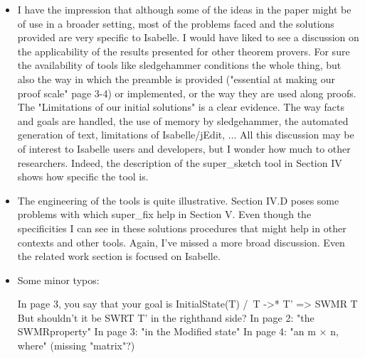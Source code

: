 \documentclass[10pt,conference]{IEEEtran}
\begin{document}
\begin{itemize}
    \item I have the impression that although some of the ideas in the paper might be of use in a broader setting, most of the problems faced and the solutions provided are very specific to Isabelle. I would have liked to see a discussion on the applicability of the results presented for other theorem provers. For sure the availability of tools like sledgehammer conditions the whole thing, but also the way in which the preamble is provided ("essential at making our proof scale" page 3-4) or implemented, or the way they are used along proofs. The "Limitations of our initial solutions" is a clear evidence. The way facts and goals are handled, the use of memory by sledgehammer, the automated generation of text, limitations of Isabelle/jEdit, ... All this discussion may be of interest to Isabelle users and developers, but I wonder how much to other researchers. Indeed, the description of the super\_sketch tool in Section IV shows how specific the tool is.
    \item The engineering of the tools is quite illustrative. Section IV.D poses some problems with which super\_fix help in Section V. Even though the specificities I can see in these solutions procedures that might help in other contexts and other tools. Again, I've missed a more broad discussion. Even the related work section is focused on Isabelle.
\item 
Some minor typos:

In page 3, you say that your goal is InitialState(T) /\ T ->* T' => SWMR T But shouldn't it be SWRT T' in the righthand side?
In page 2: "the SWMRproperty"
In page 3: "in the Modified state"
In page 4: "an m × n, where" (missing "matrix"?)
\end{itemize}
\fi








\end{document}
